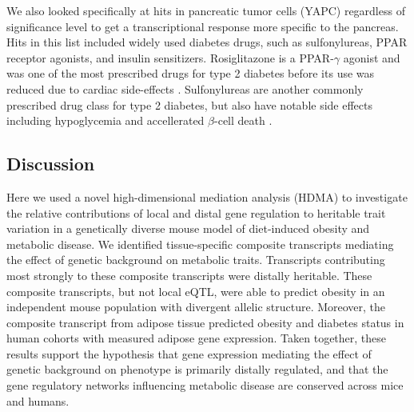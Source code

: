 \documentclass[
]{article}
\begin{document}
We also looked specifically at hits in pancreatic tumor cells (YAPC)
regardless of significance level to get a transcriptional response more
specific to the pancreas. Hits in this list included widely used
diabetes drugs, such as sulfonylureas, PPAR receptor agonists, and
insulin sensitizers. Rosiglitazone is a PPAR-\(\gamma\) agonist and was
one of the most prescribed drugs for type 2 diabetes before its use was
reduced due to cardiac side-effects \cite{pmid21190462}. Sulfonylureas
are another commonly prescribed drug class for type 2 diabetes, but also
have notable side effects including hypoglycemia and accellerated
\(\beta\)-cell death \cite{pmid16631807}.

\subsection{Discussion}\label{discussion}

Here we used a novel high-dimensional mediation analysis (HDMA) to
investigate the relative contributions of local and distal gene
regulation to heritable trait variation in a genetically diverse mouse
model of diet-induced obesity and metabolic disease. We identified
tissue-specific composite transcripts mediating the effect of genetic
background on metabolic traits. Transcripts contributing most strongly
to these composite transcripts were distally heritable. These composite
transcripts, but not local eQTL, were able to predict obesity in an
independent mouse population with divergent allelic structure. Moreover,
the composite transcript from adipose tissue predicted obesity and
diabetes status in human cohorts with measured adipose gene expression.
Taken together, these results support the hypothesis that gene
expression mediating the effect of genetic background on phenotype is
primarily distally regulated, and that the gene regulatory networks
influencing metabolic disease are conserved across mice and humans.
\end{document}
